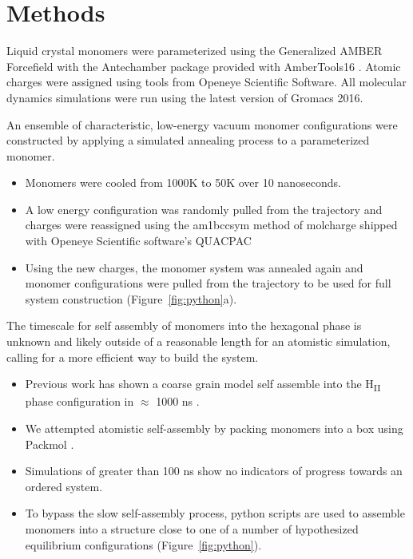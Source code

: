 \documentclass{article}
\begin{document}
  \section*{Methods}
  
  Liquid crystal monomers were parameterized using the Generalized AMBER Forcefield
  \cite{wang_development_2004} with the Antechamber package \cite{wang_automatic_2006}
  provided with AmberTools16 \cite{case_ambertools16_2016}. Atomic charges were
  assigned using tools from Openeye Scientific Software. All molecular dynamics 
  simulations were run using the latest version of Gromacs 2016. 
  \cite{bekker_gromacs:_1993,berendsen_gromacs:_1995,van_der_spoel_gromacs:_2005,hess_gromacs_2008}
  
  An ensemble of characteristic, low-energy vacuum monomer configurations
  were constructed by applying a simulated annealing process to a
  parameterized monomer.
  \begin{itemize}
    \item Monomers were cooled from 1000K to 50K over 10 nanoseconds.
    \item A low energy configuration was randomly pulled from the trajectory
    and charges were reassigned using the am1bccsym method of molcharge
    shipped with Openeye Scientific software's QUACPAC %
    \item Using the new charges, the monomer system was annealed again and monomer
    configurations were pulled from the trajectory to be used for full
    system construction (Figure~\ref{fig:python}a).
  \end{itemize}
  
  The timescale for self assembly of monomers into the hexagonal phase is
  unknown and likely outside of a reasonable length for an atomistic
  simulation, calling for a more efficient way to build the system. 
  \begin{itemize}
    \item Previous work has shown a coarse grain model self assemble into
    the H\textsubscript{II} phase configuration in $\approx$ 1000 ns \cite{mondal_self-assembly_2013}.
    \item We attempted atomistic self-assembly by packing monomers into a box 
    using Packmol \cite{martinez_packmol:_2009}.
    \item Simulations of greater than 100 ns show no indicators of progress 
    towards an ordered system.  %
    \item To bypass the slow self-assembly process, python scripts are used
    to assemble monomers into a structure close to one of a number of 
    hypothesized equilibrium configurations (Figure~\ref{fig:python}).
  \end{itemize}
\end{document}
